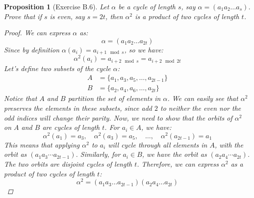 \documentclass[12pt]{article}
\newtheorem{proposition}{Proposition}
\begin{document}
\begin{proposition}[Exercise B.6]
  Let $\alpha$ be a cycle of length $s$, say $\alpha = (a_1 a_2 \ldots a_s)$.
  Prove that if $s$ is even, say $s = 2t$, then $\alpha^2$ is a product of two cycles of length $t$.
  \begin{proof}
    We can express $\alpha$ as:
    \[
      \alpha = (a_1 a_2 \ldots a_{2t})
    \]
    Since by definition $\alpha(a_i) = a_{i + 1 \mod s}$, so we have:
    \[
      \alpha^2(a_i) = a_{i + 2 \mod s} = a_{i + 2 \mod 2t}
    \]
    Let's define two subsets of the cycle $\alpha$:
    \begin{align*}
      A & = \{a_1, a_3, a_5, \ldots, a_{2t - 1}\} \\
      B & = \{a_2, a_4, a_6, \ldots, a_{2t}\}
    \end{align*}
    Notice that $A$ and $B$ partition the set of elements in $\alpha$.
    We can easily see that $\alpha^2$ preserves the elements in these subsets, since add $2$
    to neither the even nor the odd indices will change their parity.
    Now, we need to show that the orbits of $\alpha^2$ on $A$ and $B$ are cycles of length $t$.
    For $a_i \in A$, we have:
    \[
      \alpha^2(a_1) = a_3, \quad \alpha^2(a_3) = a_5, \quad \ldots, \quad \alpha^2(a_{2t - 1}) = a_1
    \]
    This means that applying $\alpha^2$ to $a_i$ will cycle through all elements in $A$, with the orbit as $(a_1a_3\cdots a_{2t-1})$.
    Similarly, for $a_i \in B$, we have the orbit as $(a_2a_4\cdots a_{2t})$. The two orbits are disjoint cycles of length $t$.
    Therefore, we can express $\alpha^2$ as a product of two cycles of length $t$:
    \[
      \alpha^2 = (a_1 a_3 \ldots a_{2t - 1})(a_2 a_4 \ldots a_{2t})
    \]
  \end{proof}
\end{proposition}
\end{document}
